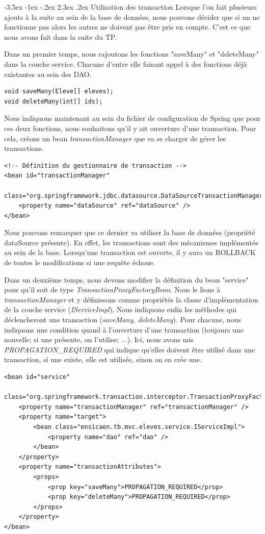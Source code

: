 \documentclass[a4paper,12pt]{article}
\makeatletter
\renewcommand\section{\@startsection {section}{1}{\z@}%
                           {-3.5ex \@plus -1ex \@minus -.2ex}%
                           {2.3ex \@plus.2ex}%
                           {\normalfont\Large\bfseries}}
\makeatother
\begin{document}
\newpage
\section{Utilisation des transaction}
Lorsque l'on fait plusieurs ajouts à la suite au sein de la base de données, nous pouvons décider que si un ne fonctionne pas 
alors les autres ne doivent pas être pris en compte. C'est ce que nous avons fait dans la suite du TP.

Dans un premier temps, nous rajoutons les fonctions "saveMany" et "deleteMany" dans la couche service. Chacune d'entre elle faisant appel 
à des fonctions déjà existantes au sein des DAO.
\begin{lstlisting}
void saveMany(Eleve[] eleves);
void deleteMany(int[] ids);
\end{lstlisting}

Nous indiquons maintenant au sein du fichier de configuration de Spring que pour ces deux fonctions, nous souhaitons qu'il y ait ouverture d'une transaction.
Pour cela, créons un bean \textit{transactionManager} que va se charger de gérer les transactions.
\begin{lstlisting}
<!-- Définition du gestionnaire de transaction -->
<bean id="transactionManager"
	class="org.springframework.jdbc.datasource.DataSourceTransactionManager">
	<property name="dataSource" ref="dataSource" />
</bean>
\end{lstlisting}
Nous pouvons remarquer que ce dernier va utiliser la base de données (propriété dataSource présente). En effet, les transactions sont des mécanismes
implémentés au sein de la base. Lorsqu'une transaction est ouverte, il y aura un ROLLBACK de toutes le modifications si une requête échoue.

Dans un deuxième temps, nous devons modifier la définition du bean "service" pour qu'il soit de type \textit{TransactionProxyFactoryBean}. 
Nous le lions à \textit{transactionManager} et y définissons comme propriétés la classe d'implémentation de la couche service (\textit{IServiceImpl}). 
Nous indiquons enfin les méthodes qui déclencheront une transaction (\textit{saveMany, deleteMany}). Pour chacune, nous indiquons une 
condition quand à l'ouverture d'une transaction (toujours une nouvelle; si une présente, on l'utilise; ...). Ici, nous avons mis \textit{PROPAGATION\_REQUIRED}
qui indique qu'elles doivent être utilisé dans une transaction, si une existe, elle est utilisée, sinon on en crée une.
\begin{lstlisting}
<bean id="service"
	class="org.springframework.transaction.interceptor.TransactionProxyFactoryBean">
	<property name="transactionManager" ref="transactionManager" />
	<property name="target">
		<bean class="ensicaen.tb.mvc.eleves.service.IServiceImpl">
			<property name="dao" ref="dao" />
		</bean>
	</property>
	<property name="transactionAttributes">
		<props>
			<prop key="saveMany">PROPAGATION_REQUIRED</prop>
			<prop key="deleteMany">PROPAGATION_REQUIRED</prop>
		</props>
	</property>
</bean>
\end{lstlisting}
\end{document}
